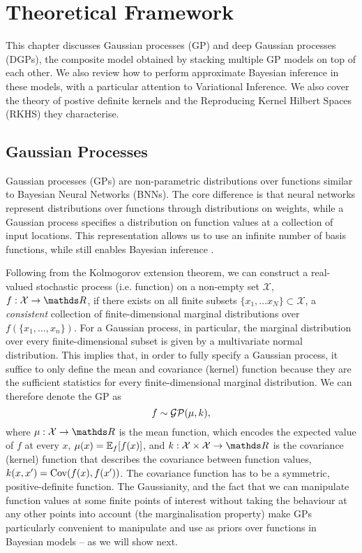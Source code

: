 
\chapter{Theoretical Framework}
\label{chapter:theoretical-framework}

This chapter discusses Gaussian processes (GP) and deep Gaussian processes (DGPs), the composite model obtained by stacking multiple GP models on top of each other. We also review how to perform approximate Bayesian inference in these models, with a particular attention to Variational Inference. We also cover the theory of postive definite kernels and the Reproducing Kernel Hilbert Spaces (RKHS) they characterise.

\section{Gaussian Processes}
\label{sec:chapter1:gp}


Gaussian processes (GPs) \citep{rasmussen2006} are non-parametric distributions over functions similar to Bayesian Neural Networks (BNNs). The core difference is that neural networks represent distributions over functions through distributions on weights, while a Gaussian process specifies a distribution on function values at a collection of input locations. This representation allows us to use an infinite number of basis functions, while still enables Bayesian inference \citep{neal1996bayesian}. 

Following from the Kolmogorov extension theorem, we can construct a real-valued stochastic process (i.e. function) on a non-empty set $\mathcal{X}$, $f: \mathcal{X} \rightarrow \Reals$, if there exists on all finite subsets $\{x_1, \ldots x_N\} \subset \mathcal{X}$, a \emph{consistent} collection of finite-dimensional marginal distributions over $f(\{x_1, \ldots, x_n\})$. For a Gaussian process, in particular, the marginal distribution over every finite-dimensional subset is given by a multivariate normal distribution. This implies that, in order to fully specify a Gaussian process, it suffice to only define the mean and covariance (kernel) function because they are the sufficient statistics for every finite-dimensional marginal distribution. We can therefore denote the GP as
\begin{equation}
  \label{eq:chapter1:def-gp}
  f \sim \mathcal{GP}(\mu, k),
\end{equation}
where $\mu:\mathcal{X}\rightarrow\Reals$ is the mean function, which encodes the expected value of $f$ at every $x$, $\mu(x) = \Exp{f}{f(x)}$, and $k:\mathcal{X} \times \mathcal{X} \rightarrow \Reals$ is the covariance (kernel) function that describes the covariance between function values, $k(x, x') = \Cov\left(f(x), f(x')\right)$. The covariance function has to be a symmetric, positive-definite function. The Gaussianity, and the fact that we can manipulate function values at some finite points of interest without taking the behaviour at any other points into account (the marginalisation property) make GPs particularly convenient to manipulate and use as priors over functions in Bayesian models -- as we will show next.

